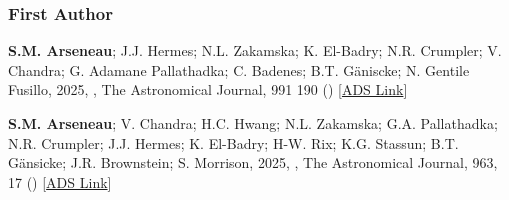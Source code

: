 \documentclass[12pt,letterpaper]{article}
\begin{document}
\subsubsection{First Author}
\begin{list}{}{\cvlist}
  \item[{\color{numcolor}\scriptsize2}] \textbf{S.M. Arseneau}; J.J. Hermes; N.L. Zakamska; K. El-Badry; N.R. Crumpler; V. Chandra; G. Adamane Pallathadka; C. Badenes; B.T. G\"aniscke; N. Gentile Fusillo, 2025, , The Astronomical Journal, 991 190 () [\href{https://ui.adsabs.harvard.edu/abs/2025arXiv250804775A}{ADS Link}]

  \item[{\color{numcolor}\scriptsize1}] \textbf{S.M. Arseneau}; V. Chandra; H.C. Hwang; N.L. Zakamska; G.A. Pallathadka; N.R. Crumpler; J.J. Hermes; K. El-Badry; H-W. Rix; K.G. Stassun; B.T. G\"ansicke; J.R. Brownstein; S. Morrison, 2025, , The Astronomical Journal, 963, 17 () [\href{https://ui.adsabs.harvard.edu/abs/2024ApJ...963...17A/abstract}{ADS Link}]
\end{list}
\end{document}

